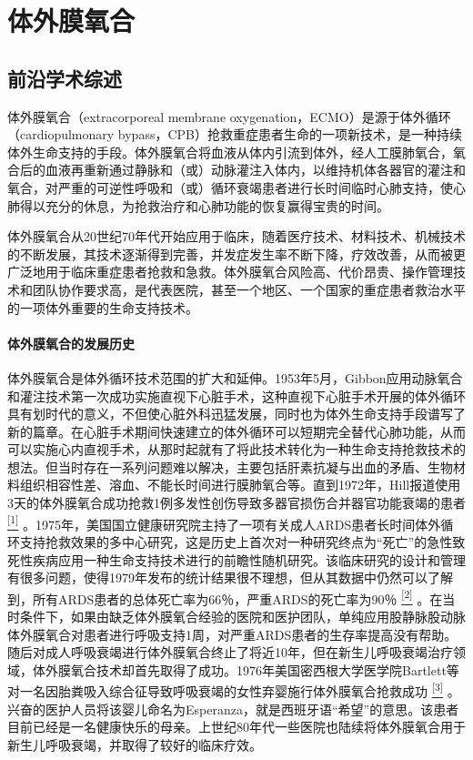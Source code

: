 \chapter{体外膜氧合}

\section{前沿学术综述}

体外膜氧合（extracorporeal membrane
oxygenation，ECMO）是源于体外循环（cardiopulmonary
bypass，CPB）抢救重症患者生命的一项新技术，是一种持续体外生命支持的手段。体外膜氧合将血液从体内引流到体外，经人工膜肺氧合，氧合后的血液再重新通过静脉和（或）动脉灌注入体内，以维持机体各器官的灌注和氧合，对严重的可逆性呼吸和（或）循环衰竭患者进行长时间临时心肺支持，使心肺得以充分的休息，为抢救治疗和心肺功能的恢复赢得宝贵的时间。

体外膜氧合从20世纪70年代开始应用于临床，随着医疗技术、材料技术、机械技术的不断发展，其技术逐渐得到完善，并发症发生率不断下降，疗效改善，从而被更广泛地用于临床重症患者抢救和急救。体外膜氧合风险高、代价昂贵、操作管理技术和团队协作要求高，是代表医院，甚至一个地区、一个国家的重症患者救治水平的一项体外重要的生命支持技术。

\subsubsection{体外膜氧合的发展历史}

体外膜氧合是体外循环技术范围的扩大和延伸。1953年5月，Gibbon应用动脉氧合和灌注技术第一次成功实施直视下心脏手术，这种直视下心脏手术开展的体外循环具有划时代的意义，不但使心脏外科迅猛发展，同时也为体外生命支持手段谱写了新的篇章。在心脏手术期间快速建立的体外循环可以短期完全替代心肺功能，从而可以实施心内直视手术，从那时起就有了将此技术转化为一种生命支持抢救技术的想法。但当时存在一系列问题难以解决，主要包括肝素抗凝与出血的矛盾、生物材料组织相容性差、溶血、不能长时间进行膜肺氧合等。直到1972年，Hill报道使用3天的体外膜氧合成功抢救1例多发性创伤导致多器官损伤合并器官功能衰竭的患者
\protect\hyperlink{text00030.htmlux5cux23ch1-29}{\textsuperscript{{[}1{]}}}
。1975年，美国国立健康研究院主持了一项有关成人ARDS患者长时间体外循环支持抢救效果的多中心研究，这是历史上首次对一种研究终点为“死亡”的急性致死性疾病应用一种生命支持技术进行的前瞻性随机研究。该临床研究的设计和管理有很多问题，使得1979年发布的统计结果很不理想，但从其数据中仍然可以了解到，所有ARDS患者的总体死亡率为66％，严重ARDS的死亡率为90％
\protect\hyperlink{text00030.htmlux5cux23ch2-29}{\textsuperscript{{[}2{]}}}
。在当时条件下，如果由缺乏体外膜氧合经验的医院和医护团队，单纯应用股静脉股动脉体外膜氧合对患者进行呼吸支持1周，对严重ARDS患者的生存率提高没有帮助。随后对成人呼吸衰竭进行体外膜氧合终止了将近10年，但在新生儿呼吸衰竭治疗领域，体外膜氧合技术却首先取得了成功。1976年美国密西根大学医学院Bartlett等对一名因胎粪吸入综合征导致呼吸衰竭的女性弃婴施行体外膜氧合抢救成功
\protect\hyperlink{text00030.htmlux5cux23ch3-29}{\textsuperscript{{[}3{]}}}
。兴奋的医护人员将该婴儿命名为Esperanza，就是西班牙语“希望”的意思。该患者目前已经是一名健康快乐的母亲。上世纪80年代一些医院也陆续将体外膜氧合用于新生儿呼吸衰竭，并取得了较好的临床疗效。

